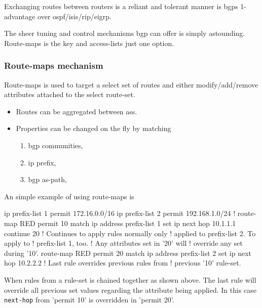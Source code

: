 Exchanging routes between routers is a reliant and tolerant manner is \glspl{bgp} 1-advantage over \gls{ospf}/\gls{isis}/\gls{rip}/\gls{eigrp}.

The sheer tuning and control mechanisms \gls{bgp} can offer is simply astounding. Route-maps is the key and access-lists just one option.

\subsubsection[Route-maps]{Route-maps mechanism}

Route-maps is used to target a select set of routes and either modify/add/remove attributes attached to the select route-set.

\begin{itemize}
    \item Routes can be aggregated between \glspl{as}.
    \item Properties can be changed on the fly by matching
    \begin{enumerate}[label={\alph*)}]
        \item \Gls{bgp} communities,
        \item \Gls{ip} prefix,
        \item \Gls{bgp} as-path, 
    \end{enumerate}
\end{itemize}

An simple example of using route-maps is

\begin{cisco}
ip prefix-list 1 permit 172.16.0.0/16 
ip prefix-list 2 permit 192.168.1.0/24 
!
route-map RED permit 10 
 match ip address prefix-list 1 
 set ip next hop 10.1.1.1
 continue 20              ! Continues to apply rules normally only
                          ! applied to prefix-list 2. To apply to
                          ! prefix-list 1, too.
                          ! Any attributes set in '20' will
                          ! override any set during '10'.
route-map RED permit 20 
 match ip address prefix-list 2 
 set ip next hop 10.2.2.2 ! Last rule overrides previous rules from
                          ! previous '10' rule-set.
\end{cisco}

When rules from a rule-set is chained together as shown above. The last rule will override all previous set values regarding the attribute being applied. In this case \texttt{next-hop} from 'permit 10' is overridden in 'permit 20'.


